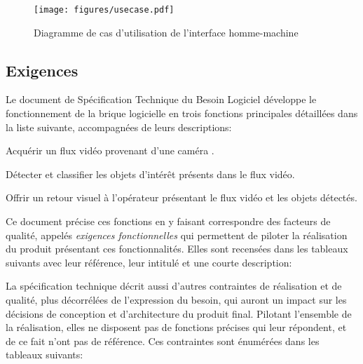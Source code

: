 			\begin{figure}[h]
			{
				\centering
				\texttt{[image: figures/usecase.pdf]}
				\caption{Diagramme de cas d'utilisation de l'interface homme-machine}
				\label{fig:usecase}
			}
			\end{figure}



		\subsection{Exigences}

			Le document de Spécification Technique du Besoin Logiciel développe le fonctionnement de la brique logicielle en trois fonctions principales détaillées dans la liste suivante, accompagnées de leurs descriptions:
			\begin{description}[noitemsep, before={\setcounter{descriptcount}{0}},font=\bfseries\stepcounter{descriptcount}\thedescriptcount.~]
				\item[Acquisition Vidéo:] Acquérir un flux vidéo provenant d’une caméra \degre.
				\item[Détection:] Détecter et classifier les objets d’intérêt présents dans le flux vidéo.
				\item[Retour visuel:] Offrir un retour visuel à l’opérateur présentant le flux vidéo et les objets détectés.
			\end{description}
			Ce document précise ces fonctions en y faisant correspondre des facteurs de qualité, appelés \emph{exigences fonctionnelles} qui permettent de piloter la réalisation du produit présentant ces fonctionnalités. Elles sont recensées dans les tableaux suivants avec leur référence, leur intitulé et une courte description:
			
			
			\bigskip

			La spécification technique décrit aussi d'autres contraintes de réalisation et de qualité, plus décorrélées de l'expression du besoin, qui auront un impact sur les décisions de conception et d'architecture du produit final. Pilotant l'ensemble de la réalisation, elles ne disposent pas de fonctions précises qui leur répondent, et de ce fait n'ont pas de référence. Ces contraintes sont énumérées dans les tableaux suivants:
			
			
			


